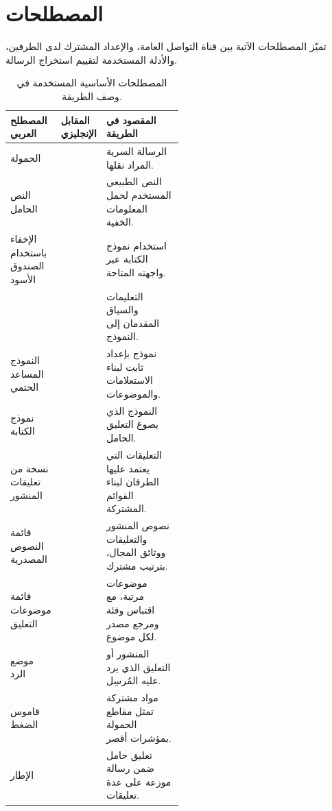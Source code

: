 \section{المصطلحات}
\label{sec:terminology}

تميّز المصطلحات الآتية بين قناة التواصل العامة، والإعداد المشترك لدى الطرفين، والأدلة المستخدمة لتقييم استخراج الرسالة.

\begin{table}[htbp]
\centering\small
\caption{المصطلحات الأساسية المستخدمة في وصف الطريقة.}
\label{tab:terminology}
\begin{RTL}
\begin{tabularx}{\linewidth}{|A{0.25\linewidth}|A{0.25\linewidth}|B|}
\hline
المصطلح العربي & المقابل الإنجليزي & المقصود في الطريقة \\
\hline
الحمولة &  & الرسالة السرية المراد نقلها. \\
\hline
النص الحامل &  & النص الطبيعي المستخدم لحمل المعلومات الخفية. \\
\hline
الإخفاء باستخدام الصندوق الأسود &  & استخدام نموذج الكتابة عبر واجهته المتاحة. \\
\hline
{} &  & التعليمات والسياق المقدمان إلى النموذج. \\
\hline
النموذج المساعد الحتمي &  & نموذج بإعداد ثابت لبناء الاستعلامات والموضوعات. \\
\hline
نموذج الكتابة &  & النموذج الذي يصوغ التعليق الحامل. \\
\hline
نسخة من تعليقات المنشور &  & التعليقات التي يعتمد عليها الطرفان لبناء القوائم المشتركة. \\
\hline
قائمة النصوص المصدرية &  & نصوص المنشور والتعليقات ووثائق المجال، بترتيب مشترك. \\
\hline
قائمة موضوعات التعليق &  & موضوعات مرتبة، مع اقتباس وفئة ومرجع مصدر لكل موضوع. \\
\hline
موضع الرد &  & المنشور أو التعليق الذي يرد عليه المُرسِل. \\
\hline
قاموس الضغط &  & مواد مشتركة تمثل مقاطع الحمولة بمؤشرات أقصر. \\
\hline
الإطار &  & تعليق حامل ضمن رسالة موزعة على عدة تعليقات. \\
\hline
\end{tabularx}
\end{RTL}
\end{table}
\FloatBarrier

